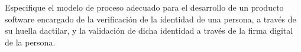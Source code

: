  Especifique el modelo de proceso adecuado para el desarrollo de un producto software encargado de la verificación de la identidad de una persona, a través de su huella dactilar, y la validación de dicha identidad a través de la firma digital de la persona.
